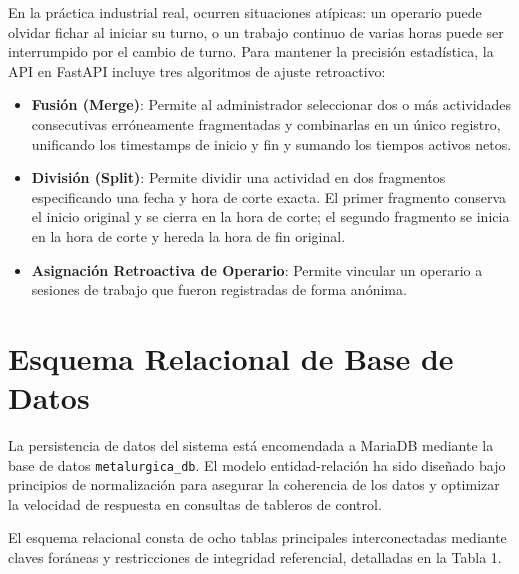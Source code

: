 \documentclass[11pt,a4paper]{article}
\begin{document}
En la práctica industrial real, ocurren situaciones atípicas: un operario puede olvidar fichar al iniciar su turno, o un trabajo continuo de varias horas puede ser interrumpido por el cambio de turno. Para mantener la precisión estadística, la API en FastAPI incluye tres algoritmos de ajuste retroactivo:
\begin{itemize}
    \item \textbf{Fusión (Merge)}: Permite al administrador seleccionar dos o más actividades consecutivas erróneamente fragmentadas y combinarlas en un único registro, unificando los timestamps de inicio y fin y sumando los tiempos activos netos.
    \item \textbf{División (Split)}: Permite dividir una actividad en dos fragmentos especificando una fecha y hora de corte exacta. El primer fragmento conserva el inicio original y se cierra en la hora de corte; el segundo fragmento se inicia en la hora de corte y hereda la hora de fin original.
    \item \textbf{Asignación Retroactiva de Operario}: Permite vincular un operario a sesiones de trabajo que fueron registradas de forma anónima.
\end{itemize}

\section{Esquema Relacional de Base de Datos}

La persistencia de datos del sistema está encomendada a MariaDB mediante la base de datos \texttt{metalurgica\_db}. El modelo entidad-relación ha sido diseñado bajo principios de normalización para asegurar la coherencia de los datos y optimizar la velocidad de respuesta en consultas de tableros de control.

El esquema relacional consta de ocho tablas principales interconectadas mediante claves foráneas y restricciones de integridad referencial, detalladas en la Tabla 1.
\end{document}
